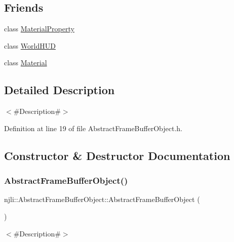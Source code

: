\subsection*{Friends}
\begin{DoxyCompactItemize}
\item 
class \mbox{\hyperlink{classnjli_1_1_abstract_frame_buffer_object_ae7c7f3376b81514442fbc2a5fe2f5ec9}{Material\+Property}}
\item 
class \mbox{\hyperlink{classnjli_1_1_abstract_frame_buffer_object_af390e9477ed759618405db2d94aa4b27}{World\+H\+UD}}
\item 
class \mbox{\hyperlink{classnjli_1_1_abstract_frame_buffer_object_aa1212b6e372a0f45d2c01f3cd203af77}{Material}}
\end{DoxyCompactItemize}


\subsection{Detailed Description}
$<$\#\+Description\#$>$ 

Definition at line 19 of file Abstract\+Frame\+Buffer\+Object.\+h.



\subsection{Constructor \& Destructor Documentation}
\mbox{\label{classnjli_1_1_abstract_frame_buffer_object_ac8d66ca8d605b2c45873fc4020c579ee}} 
\subsubsection{\texorpdfstring{Abstract\+Frame\+Buffer\+Object()}{AbstractFrameBufferObject()}\hspace{0.1cm}{\footnotesize\ttfamily [1/2]}}
{\footnotesize\ttfamily njli\+::\+Abstract\+Frame\+Buffer\+Object\+::\+Abstract\+Frame\+Buffer\+Object (\begin{DoxyParamCaption}{ }\end{DoxyParamCaption})}

$<$\#\+Description\#$>$ \mbox{\label{classnjli_1_1_abstract_frame_buffer_object_a7899eafef8e2f57953a5d1aa799085eb}} 
